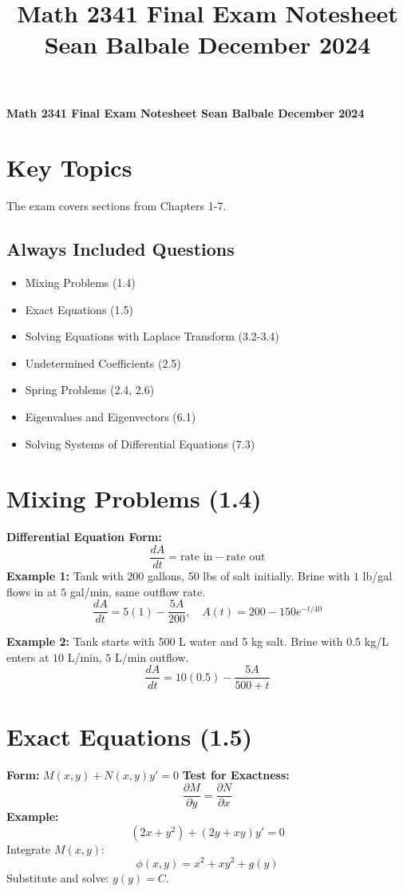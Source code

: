 \documentclass[10pt]{article}
\title{\raggedright \large Math 2341 Final Exam Notesheet \hfill Sean Balbale \hfill December 2024 \vspace{-3em}}
\date{}
\begin{document}
\textbf{Math 2341 Final Exam Notesheet \hfill Sean Balbale \hfill December 2024}
\begin{multicols}{2}

\section*{Key Topics}
The exam covers sections from Chapters 1-7.

\subsection*{Always Included Questions}
\begin{itemize}
    \item Mixing Problems (1.4)
    \item Exact Equations (1.5)
    \item Solving Equations with Laplace Transform (3.2-3.4)
    \item Undetermined Coefficients (2.5)
    \item Spring Problems (2.4, 2.6)
    \item Eigenvalues and Eigenvectors (6.1)
    \item Solving Systems of Differential Equations (7.3)
\end{itemize}

\section*{Mixing Problems (1.4)}
\textbf{Differential Equation Form:}
\[
\frac{dA}{dt} = \text{rate in} - \text{rate out}
\]
\textbf{Example 1:}  
Tank with 200 gallons, 50 lbs of salt initially. Brine with \(1\) lb/gal flows in at \(5\) gal/min, same outflow rate.
\[
\frac{dA}{dt} = 5(1) - \frac{5A}{200}, \quad A(t) = 200 - 150e^{-t/40}
\]

\textbf{Example 2:}  
Tank starts with 500 L water and 5 kg salt. Brine with \(0.5\) kg/L enters at \(10\) L/min, \(5\) L/min outflow.
\[
\frac{dA}{dt} = 10(0.5) - \frac{5A}{500+t}
\]

\section*{Exact Equations (1.5)}
\textbf{Form:} \( M(x, y) + N(x, y)y' = 0 \)  
\textbf{Test for Exactness:}  
\[
\frac{\partial M}{\partial y} = \frac{\partial N}{\partial x}
\]
\textbf{Example:}  
\[
(2x + y^2) + (2y + xy)y' = 0
\]
Integrate \( M(x, y) \):  
\[
\phi(x, y) = x^2 + xy^2 + g(y)
\]
Substitute and solve: \( g(y) = C \).


\end{multicols}
\end{document}
